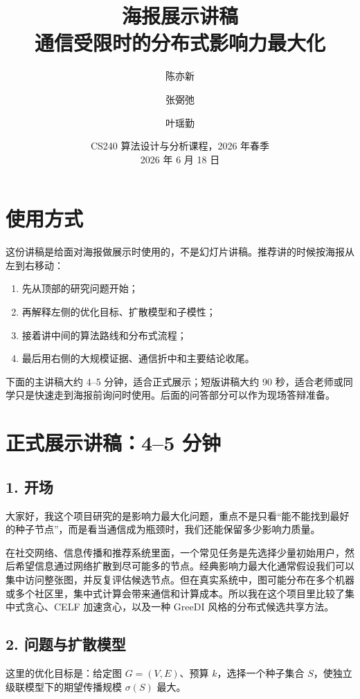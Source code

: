 \documentclass[11pt]{ctexart}
\title{海报展示讲稿\\\large 通信受限时的分布式影响力最大化}
\author{陈亦新 \and 张弼弛 \and 叶瑶勤}
\date{CS240 算法设计与分析课程，2026 年春季\\2026 年 6 月 18 日}
\begin{document}
\maketitle

\section*{使用方式}

这份讲稿是给面对海报做展示时使用的，不是幻灯片讲稿。推荐讲的时候按海报从左到右移动：
\begin{enumerate}
    \item 先从顶部的研究问题开始；
    \item 再解释左侧的优化目标、扩散模型和子模性；
    \item 接着讲中间的算法路线和分布式流程；
    \item 最后用右侧的大规模证据、通信折中和主要结论收尾。
\end{enumerate}

下面的主讲稿大约 4--5 分钟，适合正式展示；短版讲稿大约 90 秒，适合老师或同学只是快速走到海报前询问时使用。后面的问答部分可以作为现场答辩准备。

\section*{正式展示讲稿：4--5 分钟}

\subsection*{1. 开场}

大家好，我这个项目研究的是影响力最大化问题，重点不是只看“能不能找到最好的种子节点”，而是看当通信成为瓶颈时，我们还能保留多少影响力质量。

在社交网络、信息传播和推荐系统里面，一个常见任务是先选择少量初始用户，然后希望信息通过网络扩散到尽可能多的节点。经典影响力最大化通常假设我们可以集中访问整张图，并反复评估候选节点。但在真实系统中，图可能分布在多个机器或多个社区里，集中式计算会带来通信和计算成本。所以我在这个项目里比较了集中式贪心、CELF 加速贪心，以及一种 GreeDI 风格的分布式候选共享方法。

\subsection*{2. 问题与扩散模型}

这里的优化目标是：给定图 $G=(V,E)$、预算 $k$，选择一个种子集合 $S$，使独立级联模型下的期望传播规模 $\sigma(S)$ 最大。
\end{document}
